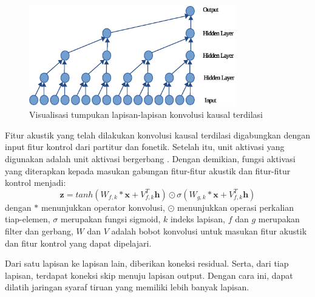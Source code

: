 \begin{figure}[h]
    \centering
    \includegraphics[width=0.8\textwidth]{resources/dilated-cnn.eps}
    \caption{Visualisasi tumpukan lapisan-lapisan konvolusi kausal terdilasi \parencite{Oord2016WaveNetAG}}\label{fig-dilated-cnn}
\end{figure}

Fitur akustik yang telah dilakukan konvolusi kausal terdilasi digabungkan dengan input fitur kontrol dari partitur dan fonetik. Setelah itu, unit aktivasi yang digunakan adalah unit aktivasi bergerbang \parencite{Oord2016ConditionalIG}. Dengan demikian, fungsi aktivasi yang diterapkan kepada masukan gabungan fitur-fitur akustik dan fitur-fitur kontrol menjadi:
\begin{equation}
    \mathbf{z} = tanh(W_{f,k}*\mathbf{x}+V^T_{f,k}\mathbf{h})\odot\sigma(W_{g,k}*\mathbf{x}+V^T_{f,k}\mathbf{h})
\end{equation}\label{eq-gated-activation}
dengan $*$ menunjukkan operator konvolusi, $\odot$ menunjukkan operasi perkalian tiap-elemen, $\sigma$ merupakan fungsi sigmoid, $k$ indeks lapisan, $f$ dan $g$ merupakan filter dan gerbang, $W$ dan $V$ adalah bobot konvolusi untuk masukan fitur akustik dan fitur kontrol yang dapat dipelajari.

Dari satu lapisan ke lapisan lain, diberikan koneksi residual. Serta, dari tiap lapisan, terdapat koneksi skip menuju lapisan output. Dengan cara ini, dapat dilatih jaringan syaraf tiruan yang memiliki lebih banyak lapisan. \parencite{He2016DeepRL}

